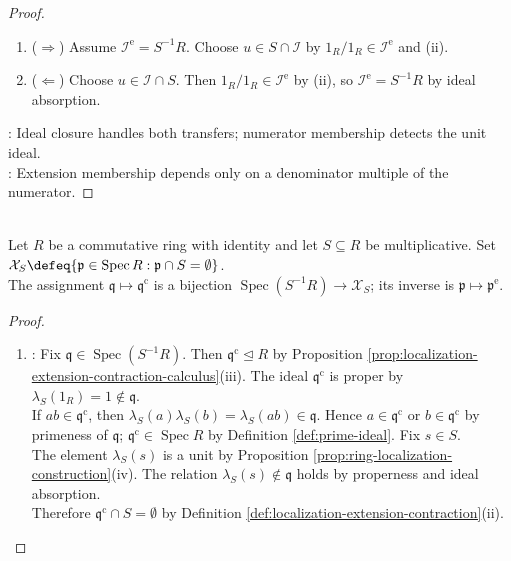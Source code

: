 \begin{proposition}
\begin{proof}
\begin{enumerate}[label=(\roman*)]
\item[$(iv)$] ($\Rightarrow$) Assume $\mathcal{I}^{\mathrm{e}}=S^{-1}R$. Choose $u\in S\cap\mathcal{I}$ by $1_R/1_R\in\mathcal{I}^{\mathrm{e}}$ and (ii).
\item[$(iv)$] ($\Leftarrow$) Choose $u\in\mathcal{I}\cap S$. Then $1_R/1_R\in\mathcal{I}^{\mathrm{e}}$ by (ii), so $\mathcal{I}^{\mathrm{e}}=S^{-1}R$ by ideal absorption.
\end{enumerate}
: Ideal closure handles both transfers; numerator membership detects the unit ideal.\\
: Extension membership depends only on a denominator multiple of the numerator.
\end{proof}
\end{proposition}

\begin{theorem} \label{thm:prime-localization-correspondence}
\\
Let $R$ be a commutative ring with identity and let $S\subseteq R$ be multiplicative. Set $\mathcal{X}_S\defeq\{\mathfrak{p}\in\operatorname{Spec}R:\mathfrak{p}\cap S=\emptyset\}$.\\
The assignment $\mathfrak{q}\mapsto\mathfrak{q}^{\mathrm{c}}$ is a bijection $\operatorname{Spec}(S^{-1}R)\to\mathcal{X}_S$; its inverse is $\mathfrak{p}\mapsto\mathfrak{p}^{\mathrm{e}}$.
\begin{proof}
\begin{enumerate}[label=(\roman*)]
\setlength{\itemsep}{0pt}
\item {}: Fix $\mathfrak{q}\in\operatorname{Spec}(S^{-1}R)$. Then $\mathfrak{q}^{\mathrm{c}}\trianglelefteq R$ by Proposition \ref{prop:localization-extension-contraction-calculus}(iii). The ideal $\mathfrak{q}^{\mathrm{c}}$ is proper by $\lambda_S(1_R)=1\notin\mathfrak{q}$.\\
If $ab\in\mathfrak{q}^{\mathrm{c}}$, then $\lambda_S(a)\lambda_S(b)=\lambda_S(ab)\in\mathfrak{q}$. Hence $a\in\mathfrak{q}^{\mathrm{c}}$ or $b\in\mathfrak{q}^{\mathrm{c}}$ by primeness of $\mathfrak{q}$; $\mathfrak{q}^{\mathrm{c}}\in\operatorname{Spec}R$ by Definition \ref{def:prime-ideal}. Fix $s\in S$.\\
The element $\lambda_S(s)$ is a unit by Proposition \ref{prop:ring-localization-construction}(iv). The relation $\lambda_S(s)\notin\mathfrak{q}$ holds by properness and ideal absorption.\\
Therefore $\mathfrak{q}^{\mathrm{c}}\cap S=\emptyset$ by Definition \ref{def:localization-extension-contraction}(ii).

\end{enumerate}
\end{proof}
\end{theorem}
